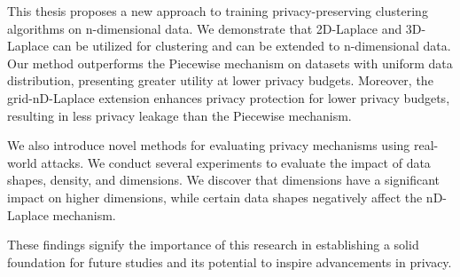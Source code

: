 This thesis proposes a new approach to training privacy-preserving clustering algorithms on n-dimensional data. We demonstrate that 2D-Laplace and 3D-Laplace can be utilized for clustering and can be extended to n-dimensional data. Our method outperforms the Piecewise mechanism on datasets with uniform data distribution, presenting greater utility at lower privacy budgets. Moreover, the grid-nD-Laplace extension enhances privacy protection for lower privacy budgets, resulting in less privacy leakage than the Piecewise mechanism. 

We also introduce novel methods for evaluating privacy mechanisms using real-world attacks. We conduct several experiments to evaluate the impact of data shapes, density, and dimensions. We discover that dimensions have a significant impact on higher dimensions, while certain data shapes negatively affect the nD-Laplace mechanism. 

These findings signify the importance of this research in establishing a solid foundation for future studies and its potential to inspire advancements in privacy.